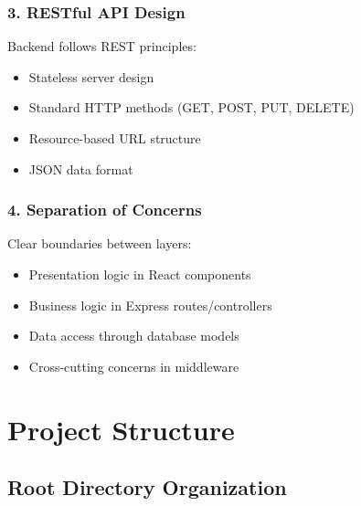 \documentclass[12pt,a4paper]{report}
\begin{document}
\subsubsection*{3. RESTful API Design}
Backend follows REST principles:
\begin{itemize}
    \item Stateless server design
    \item Standard HTTP methods (GET, POST, PUT, DELETE)
    \item Resource-based URL structure
    \item JSON data format
\end{itemize}

\subsubsection*{4. Separation of Concerns}
Clear boundaries between layers:
\begin{itemize}
    \item Presentation logic in React components
    \item Business logic in Express routes/controllers
    \item Data access through database models
    \item Cross-cutting concerns in middleware
\end{itemize}

\section{Project Structure}

\subsection*{Root Directory Organization}
\end{document}
